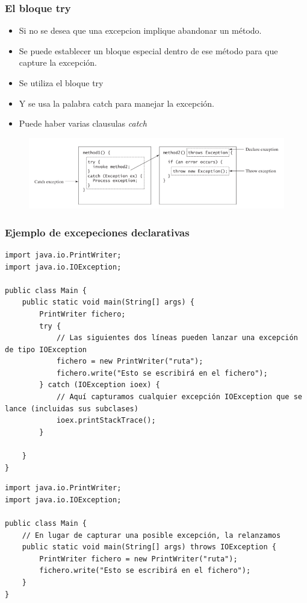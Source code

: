 \documentclass{beamer}
\begin{document}
\begin{frame}
\frametitle{El bloque try}
\begin{itemize}[<+->]
\item Si no se desea que una excepcion implique abandonar un método.
\item Se puede establecer un bloque especial dentro de ese método para que capture la excepción.
\item Se utiliza el \alert{bloque try}
\item Y se usa la palabra \alert{catch} para manejar la excepción.
\item Puede haber varias clausulas \emph{catch}
\end{itemize}
\pause
\begin{figure}
\includegraphics[scale=0.5]{imagenes/excepciones1.png}
\end{figure}
\end{frame}


\begin{frame}[fragile]
\frametitle{Ejemplo de excepeciones declarativas}
\begin{tiny}
\begin{verbatim}
import java.io.PrintWriter; 
import java.io.IOException; 

public class Main { 
    public static void main(String[] args) {         
        PrintWriter fichero; 
        try { 
            // Las siguientes dos líneas pueden lanzar una excepción de tipo IOException 
            fichero = new PrintWriter("ruta"); 
            fichero.write("Esto se escribirá en el fichero"); 
        } catch (IOException ioex) { 
            // Aquí capturamos cualquier excepción IOException que se lance (incluidas sus subclases) 
            ioex.printStackTrace(); 
        } 
         
    } 
}
\end{verbatim}
\pause
\begin{verbatim}
import java.io.PrintWriter; 
import java.io.IOException; 

public class Main { 
    // En lugar de capturar una posible excepción, la relanzamos 
    public static void main(String[] args) throws IOException {         
        PrintWriter fichero = new PrintWriter("ruta"); 
        fichero.write("Esto se escribirá en el fichero");     
    } 
}
\end{verbatim}
\end{tiny}
\end{frame}
\end{document}

